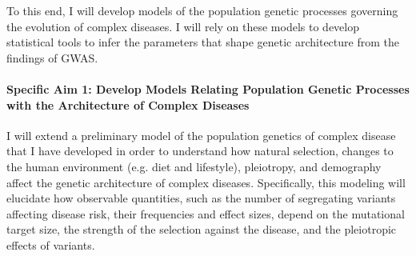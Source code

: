 \documentclass[11pt]{article}
\begin{document}
To this end, I will develop models of the population genetic processes governing the evolution of complex diseases. I will rely on these models to develop statistical tools to infer the parameters that shape genetic architecture from the findings of GWAS.


\paragraph{Specific Aim 1: Develop Models Relating Population Genetic Processes with the Architecture of Complex Diseases}
I will extend a preliminary model of the population genetics of complex disease that I have developed in order to understand how natural selection, changes to the human environment (e.g. diet and lifestyle), pleiotropy, and demography affect the genetic architecture of complex diseases. Specifically, this modeling will elucidate how observable quantities, such as the number of segregating variants affecting disease risk, their frequencies and effect sizes, depend on the mutational target size, the strength of the selection against the disease, and the pleiotropic effects of variants.

\end{document}
